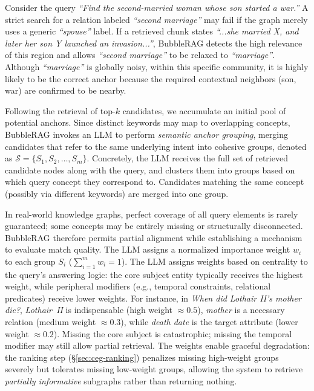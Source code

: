 \begin{exmp}
Consider the query \textit{``Find the second-married woman whose son started a war.''} A strict search for a relation labeled \textit{``second marriage''} may fail if the graph merely uses a generic \textit{``spouse''} label. If a retrieved chunk states \textit{``...she married X, and later her son Y launched an invasion...''}, BubbleRAG detects the high relevance of this region and allows \textit{``second marriage''} to be relaxed to \textit{``marriage''}. Although \textit{``marriage''} is globally noisy, within this specific community, it is highly likely to be the correct anchor because the required contextual neighbors (son, war) are confirmed to be nearby.
\end{exmp}



Following the retrieval of top-$k$ candidates, we accumulate an initial pool of potential anchors. Since distinct keywords may map to overlapping concepts, BubbleRAG invokes an LLM to perform \emph{semantic anchor grouping}, merging candidates that refer to the same underlying intent into cohesive groups, denoted as $\mathcal{S}=\{S_1,S_2,\dots,S_m\}$. Concretely, the LLM receives the full set of retrieved candidate nodes along with the query, and clusters them into groups based on which query concept they correspond to. Candidates matching the same concept (possibly via different keywords) are merged into one group.

In real-world knowledge graphs, perfect coverage of all query elements is rarely guaranteed; some concepts may be entirely missing or structurally disconnected. BubbleRAG therefore permits partial alignment while establishing a mechanism to evaluate match quality. The LLM assigns a normalized importance weight $w_i$ to each group $S_i$ ($\sum_{i=1}^{m} w_i = 1$). The LLM assigns weights based on centrality to the query's answering logic: the core subject entity typically receives the highest weight, while peripheral modifiers (e.g., temporal constraints, relational predicates) receive lower weights. For instance, in \textit{When did Lothair II's mother die?}, \textit{Lothair~II} is indispensable (high weight $\approx 0.5$), \textit{mother} is a necessary relation (medium weight $\approx 0.3$), while \textit{death date} is the target attribute (lower weight $\approx 0.2$). Missing the core subject is catastrophic; missing the temporal modifier may still allow partial retrieval. The weights enable graceful degradation: the ranking step (\S\ref{sec:ceg-ranking}) penalizes missing high-weight groups severely but tolerates missing low-weight groups, allowing the system to retrieve \emph{partially informative} subgraphs rather than returning nothing.


